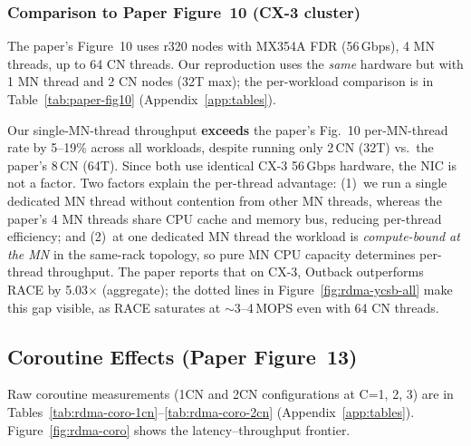 \documentclass[conference]{IEEEtran}
\begin{document}
\subsubsection{Comparison to Paper Figure~10 (CX-3 cluster)}

The paper's Figure~10 uses r320 nodes with MX354A FDR (56\,Gbps), 4 MN threads, up to 64 CN threads. Our reproduction uses the \emph{same} hardware but with 1 MN thread and 2 CN nodes (32T max); the per-workload comparison is in Table~\ref{tab:paper-fig10} (Appendix~\ref{app:tables}).

Our single-MN-thread throughput \textbf{exceeds} the paper's Fig.~10 per-MN-thread rate by 5--19\% across all workloads, despite running only 2\,CN (32T) vs.~the paper's 8\,CN (64T). Since both use identical CX-3 56\,Gbps hardware, the NIC is not a factor. Two factors explain the per-thread advantage: (1)~we run a single dedicated MN thread without contention from other MN threads, whereas the paper's 4 MN threads share CPU cache and memory bus, reducing per-thread efficiency; and (2)~at one dedicated MN thread the workload is \emph{compute-bound at the MN} in the same-rack topology, so pure MN CPU capacity determines per-thread throughput. The paper reports that on CX-3, Outback outperforms RACE by 5.03$\times$ (aggregate); the dotted lines in Figure~\ref{fig:rdma-ycsb-all} make this gap visible, as RACE saturates at $\sim$3--4\,MOPS even with 64 CN threads.

\subsection{Coroutine Effects (Paper Figure~13)}\label{sec:repro-coro}

Raw coroutine measurements (1CN and 2CN configurations at C=1, 2, 3) are in Tables~\ref{tab:rdma-coro-1cn}--\ref{tab:rdma-coro-2cn} (Appendix~\ref{app:tables}). Figure~\ref{fig:rdma-coro} shows the latency--throughput frontier.
\end{document}
